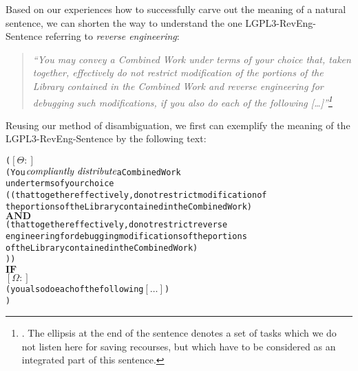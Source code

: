 %
%
%
%
%

Based on our experiences how to successfully carve out the meaning of a natural
sentence, we can shorten the way to understand the one LGPL3-RevEng-Sentence
referring to \emph{reverse engineering}:

\begin{quote}\emph{ \enquote{You may convey a Combined Work under terms of your
choice that, taken together, effectively do not restrict modification of the
portions of the Library contained in the Combined Work and reverse engineering
for debugging such modifications, if you also do each of the following
[\ldots]}\footnote{\cite[cf.][\nopage wp., §4]{Lgpl30OsiLicense2007a}. The
ellipsis at the end of the sentence denotes a set of tasks which we do not
listen here for saving recourses, but which have to be considered as an
integrated part of this sentence.}}
\end{quote}

Reusing our method of disambiguation, we first can exemplify the meaning of the
LGPL3-RevEng-Sentence by the following text:

\begin{alltt}   
( \([\Theta:]\)
  ( You \(\emph{compliantly distribute}\) a Combined Work 
    under terms of your choice 
    (   (that together effectively, do not restrict modification of 
        the portions of the Library contained in the Combined Work)
    \(\textbf{AND}\) 
        (that together effectively, do not restrict reverse
        engineering for debugging modifications of the portions
        of the Library contained in the Combined Work)
  )  )
  \(\textbf{IF}\)
  \([\Omega:]\) 
  ( you also do each of the following \([\ldots]\))
)
\end{alltt}

